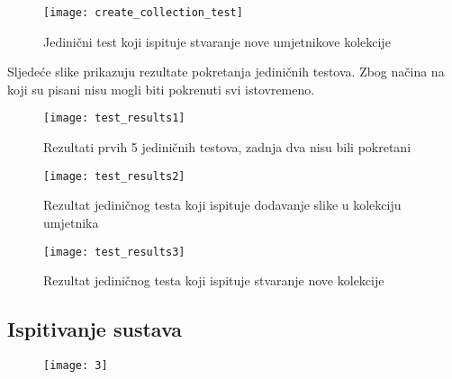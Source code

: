 {				\begin{figure}[H]
					
					\texttt{[image: create\_collection\_test]}
					\caption{Jedinični test koji ispituje stvaranje nove umjetnikove kolekcije}
					
				\end{figure}
			
			{Sljedeće slike prikazuju rezultate pokretanja jediničnih testova. Zbog načina na koji su pisani nisu mogli biti pokrenuti svi istovremeno.}
				\begin{figure}[H]
					
					\texttt{[image: test\_results1]}
					\caption{Rezultati prvih 5 jediničnih testova, zadnja dva nisu bili pokretani}
					
				\end{figure}
			
				\begin{figure}[H]
					
					\texttt{[image: test\_results2]}
					\caption{Rezultat jediničnog testa koji ispituje dodavanje slike u kolekciju umjetnika}
					
				\end{figure}
				
				\begin{figure}[H]
					
					\texttt{[image: test\_results3]}
					\caption{Rezultat jediničnog testa koji ispituje stvaranje nove kolekcije}
					
				\end{figure}
			
			\eject	
			
			\subsection{Ispitivanje sustava}
			
			 \begin{figure}[H]
			 	
			 	\texttt{[image: 3]}
			 	\caption{}
			 	
			 \end{figure}
		 
		  \begin{figure}[H]
		 	

\end{figure}}
